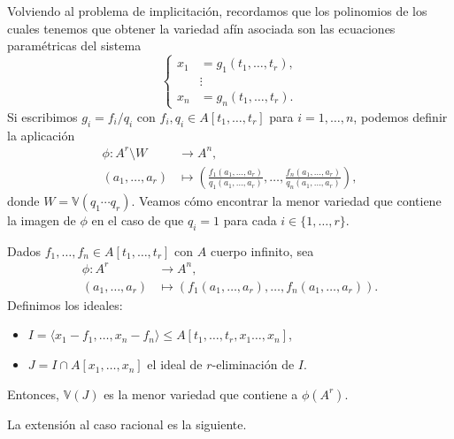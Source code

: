 Volviendo al problema de implicitación, recordamos que los polinomios de los cuales tenemos que obtener la variedad afín asociada son las ecuaciones paramétricas del sistema
\begin{equation*}
    \begin{cases}
    x_1 &= g_1(t_1,\dots, t_r),\\
    &\vdots \label{eq:paramEq} \\
    x_n &= g_n(t_1,\dots, t_r).
    \end{cases}
\end{equation*}
Si escribimos $g_i = f_i/q_i$ con $f_i,q_i \in A[t_1,\dots, t_r]$ para $i=1,\dots, n$, podemos definir la aplicación
\begin{align*}
        \phi \colon A^r\setminus W  & \to A^n,\\
        (a_1,\dots, a_r) & \mapsto \left( \frac{f_1(a_1,\dots, a_r)}{q_1(a_1,\dots, a_r)}, \dots, \frac{f_n(a_1,\dots, a_r)}{q_n(a_1,\dots, a_r)}\right),
    \end{align*}
donde $W=\mathbb{V}(q_1\cdots q_r)$. Veamos cómo encontrar la menor variedad que contiene la imagen de $\phi$ en el caso de que $q_i = 1$ para cada $i\in \{1,\dots, r\}$. 
\begin{teorema}\label{t:implicit}
    Dados $f_1,\dots, f_n \in A[t_1, \dots, t_r]$ con $A$ cuerpo infinito, sea
    \begin{align*}
        \phi \colon A^r  & \to A^n,\\
        (a_1,\dots, a_r) & \mapsto \left( f_1(a_1,\dots, a_r), \dots, f_n(a_1,\dots, a_r) \right).
    \end{align*}
    Definimos los ideales:
    \begin{itemize}
        \item $I = \langle x_1-f_1,\dots,  x_n-f_n\rangle \le A[t_1,\dots, t_r,x_1\dots, x_n]$,
        \item $J = I\cap A[x_1,\dots, x_n]$ el ideal de $r$-eliminación de $I$.
    \end{itemize}
    Entonces, $\mathbb{V}(J)$ es la menor variedad que contiene a $\phi(A^r)$.
\end{teorema}
La extensión al caso racional es la siguiente.
